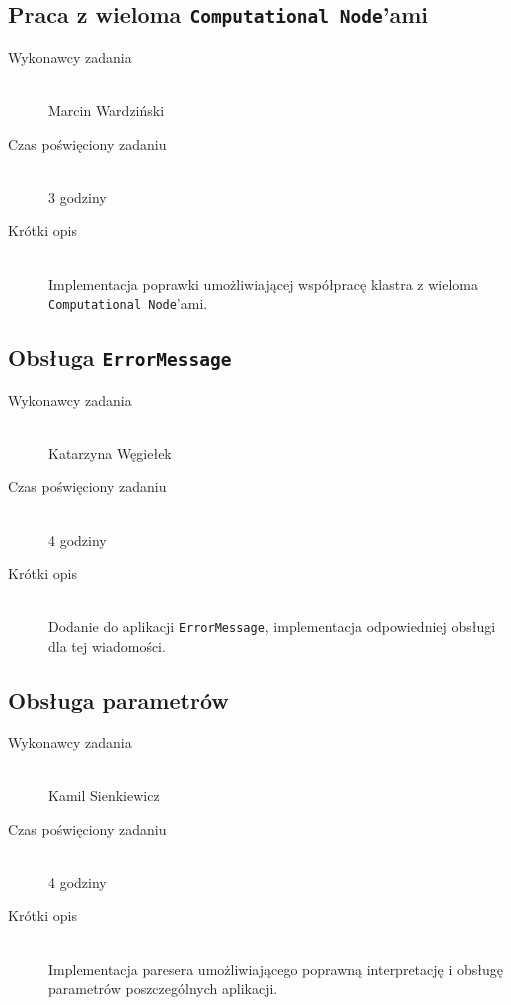 \documentclass[a4paper]{article}
\begin{document}
\subsection{Praca z wieloma \texttt{Computational Node}'ami}
\begin{description}
    \item[Wykonawcy zadania] \hfill \\ Marcin Wardziński
    \item[Czas poświęciony zadaniu] \hfill \\ 3 godziny
    \item[Krótki opis] \hfill \\ Implementacja poprawki umożliwiającej współpracę klastra z wieloma \texttt{Computational Node}'ami.
\end{description}

\subsection{Obsługa \texttt{ErrorMessage}}
\begin{description}
    \item[Wykonawcy zadania] \hfill \\ Katarzyna Węgiełek
    \item[Czas poświęciony zadaniu] \hfill \\ 4 godziny
    \item[Krótki opis] \hfill \\ Dodanie do aplikacji \texttt{ErrorMessage}, implementacja odpowiedniej obsługi dla tej wiadomości.
\end{description}
   
\subsection{Obsługa parametrów}
\begin{description}
    \item[Wykonawcy zadania] \hfill \\ Kamil Sienkiewicz
    \item[Czas poświęciony zadaniu] \hfill \\ 4 godziny
    \item[Krótki opis] \hfill \\ Implementacja paresera umożliwiającego poprawną interpretację i obsługę parametrów poszczególnych aplikacji.
\end{description}
\end{document}
